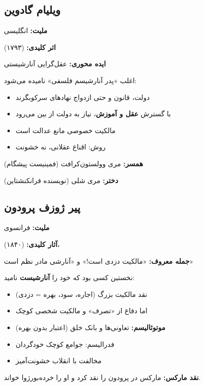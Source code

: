 \subsection{ویلیام گادوین}

\begin{personbox}

\textbf{ملیت:} انگلیسی

\textbf{اثر کلیدی:}  (۱۷۹۳)

\textbf{ایده محوری:} عقل‌گرایی آنارشیستی

\mediumspace

 اغلب «پدر آنارشیسم فلسفی» نامیده می‌شود:

\begin{itemize}[nosep]
    \item دولت، قانون و حتی ازدواج نهادهای سرکوبگرند
    \item با گسترش \textbf{عقل و آموزش}، نیاز به دولت از بین می‌رود
    \item مالکیت خصوصی مانع عدالت است
    \item روش: اقناع عقلانی، نه خشونت
\end{itemize}

\mediumspace

\textbf{همسر:} مری وولستون‌کرافت (فمینیست پیشگام)

\textbf{دختر:} مری شلی (نویسنده فرانکنشتاین)
\end{personbox}

\subsection{پیر ژوزف پرودون}

\begin{personbox}

\textbf{ملیت:} فرانسوی

\textbf{آثار کلیدی:}  (۱۸۴۰)، 

\textbf{جمله معروف:} «مالکیت دزدی است!» و «آنارشی مادر نظم است»

\mediumspace

 نخستین کسی بود که خود را \textbf{آنارشیست} نامید:

\begin{itemize}[nosep]
    \item نقد مالکیت بزرگ (اجاره، سود، بهره = دزدی)
    \item اما دفاع از «تصرف» و مالکیت شخصی کوچک
    \item \textbf{موتوئالیسم:} تعاونی‌ها و بانک خلق (اعتبار بدون بهره)
    \item فدرالیسم: جوامع کوچک خودگردان
    \item مخالفت با انقلاب خشونت‌آمیز
\end{itemize}

\mediumspace

\textbf{نقد مارکس:} مارکس در  پرودون را نقد کرد و او را خرده‌بورژوا خواند.
\end{personbox}

